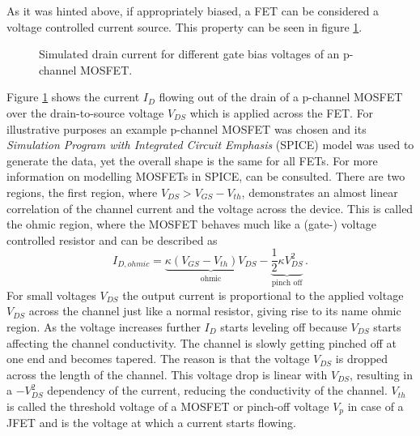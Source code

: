 As it was hinted above, if appropriately biased, a FET can be considered a voltage controlled current source. This property can be seen in figure \ref{fig:fet_curret_gate_bias}.
\begin{figure}[hb]
    \centering
    \caption{Simulated drain current for different gate bias voltages of an  p-channel MOSFET.}
    \label{fig:fet_curret_gate_bias}
\end{figure}

Figure \ref{fig:fet_curret_gate_bias} shows the current $I_D$ flowing out of the drain of a p-channel MOSFET over the drain-to-source voltage $V_{DS}$ which is applied across the FET. For illustrative purposes an example p-channel MOSFET was chosen and its \textit{Simulation Program with Integrated Circuit Emphasis} (SPICE) model \cite{irf9610_spice,irf9610_spice_better} was used to generate the data, yet the overall shape is the same for all FETs. For more information on modelling MOSFETs in SPICE, \citep[p. 442]{spice_mosfets} can be consulted. There are two regions, the first region, where $V_{DS} > V_{GS} - V_{th}$, demonstrates an almost linear correlation of the channel current and the voltage across the device. This is called the ohmic region, where the MOSFET behaves much like a (gate-) voltage controlled resistor and can be described \cite{shockley_fet_equations} as
\begin{equation}
    I_{D,ohmic} = \underbrace{\kappa (V_{GS} - V_{th}) V_{DS}}_{\text{ohmic}} - \underbrace{\frac 1 2 \kappa V_{DS}^2}_{\text{pinch off}} \, .
\end{equation}
For small voltages $V_{DS}$ the output current is proportional to the applied voltage $V_{DS}$ across the channel just like a normal resistor, giving rise to its name ohmic region. As the voltage increases further $I_D$ starts leveling off because $V_{DS}$ starts affecting the channel conductivity. The channel is slowly getting pinched off at one end and becomes tapered. The reason is that the voltage $V_{DS}$ is dropped across the length of the channel. This voltage drop is linear with $V_{DS}$, resulting in a $-V_{DS}^2$ dependency of the current, reducing the conductivity of the channel. $V_{th}$ is called the threshold voltage of a MOSFET or pinch-off voltage $V_p$ in case of a JFET and is the voltage at which a current starts flowing.

